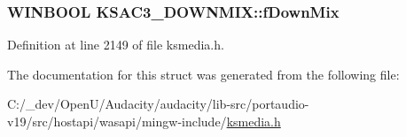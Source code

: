 \subsubsection[{\texorpdfstring{f\+Down\+Mix}{fDownMix}}]{\setlength{\rightskip}{0pt plus 5cm}W\+I\+N\+B\+O\+OL K\+S\+A\+C3\+\_\+\+D\+O\+W\+N\+M\+I\+X\+::f\+Down\+Mix}\hypertarget{struct_k_s_a_c3___d_o_w_n_m_i_x_a84ced7595ea6d3e4d207bdf5a96614f1}{}\label{struct_k_s_a_c3___d_o_w_n_m_i_x_a84ced7595ea6d3e4d207bdf5a96614f1}


Definition at line 2149 of file ksmedia.\+h.



The documentation for this struct was generated from the following file\+:\begin{DoxyCompactItemize}
\item 
C\+:/\+\_\+dev/\+Open\+U/\+Audacity/audacity/lib-\/src/portaudio-\/v19/src/hostapi/wasapi/mingw-\/include/\hyperlink{ksmedia_8h}{ksmedia.\+h}\end{DoxyCompactItemize}
